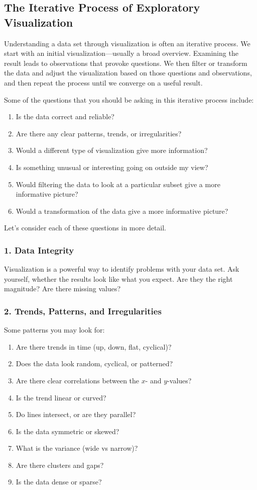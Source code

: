 \subsection*{The Iterative Process of Exploratory Visualization} 

Understanding a data set through visualization is often an iterative process. We start with an initial visualization---usually a broad overview.  Examining the result leads to observations that provoke questions.  We then filter or transform the data and adjust the visualization based on those questions and observations, and then repeat the process until we converge on a useful result.

Some of the questions that you should be asking in this iterative process include:
\begin{enumerate}
\item Is the data correct and reliable? 
\item Are there any clear patterns, trends, or irregularities?
\item Would a different type of visualization give more information?
\item Is something unusual or interesting going on outside my view?
\item Would filtering the data to look at a particular subset give a more informative picture?
\item Would a transformation of the data give a more informative picture?
\end{enumerate}
Let's consider each of these questions in more detail.

\subsubsection*{1. Data Integrity}

Visualization is a powerful way to identify problems with your data set.  Ask yourself, whether the results look like what you expect.  Are they the right magnitude? Are there missing values? 

\subsubsection*{2. Trends, Patterns, and Irregularities}

Some patterns you may look for:
\begin{enumerate}
\item Are there trends in time (up, down, flat, cyclical)?
\item Does the data look random, cyclical, or patterned?
\item Are there clear correlations between the $x$- and $y$-values? 
\item Is the trend linear or curved?
\item Do lines intersect, or are they parallel?
\item Is the data symmetric or skewed?
\item What is the variance (wide vs narrow)?
\item Are there clusters and gaps?
\item Is the data dense or sparse?
\end{enumerate}

